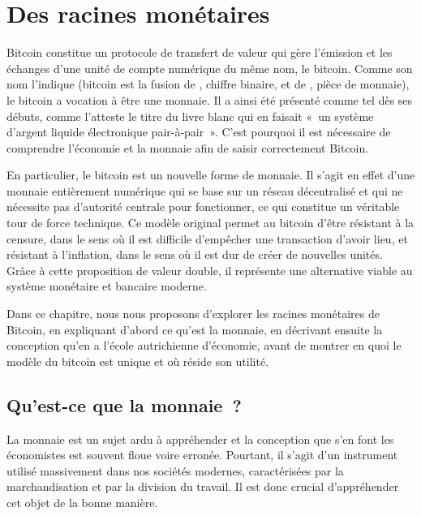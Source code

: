 
\chapter{Des racines monétaires}
\label{ch:monnaie}

Bitcoin constitue un protocole de transfert de valeur qui gère l'émission et les échanges d'une unité de compte numérique du même nom, le bitcoin. Comme son nom l'indique (bitcoin est la fusion de , chiffre binaire, et de , pièce de monnaie), le bitcoin a vocation à être une monnaie. Il a ainsi été présenté comme tel dès ses débuts, comme l'atteste le titre du livre blanc qui en faisait «~un système d'argent liquide électronique pair-à-pair~». C'est pourquoi il est nécessaire de comprendre l'économie et la monnaie afin de saisir correctement Bitcoin.

En particulier, le bitcoin est un nouvelle forme de monnaie. Il s'agit en effet d'une monnaie entièrement numérique qui se base sur un réseau décentralisé et qui ne nécessite pas d'autorité centrale pour fonctionner, ce qui constitue un véritable tour de force technique. Ce modèle original permet au bitcoin d'être résistant à la censure, dans le sens où il est difficile d'empêcher une transaction d'avoir lieu, et résistant à l'inflation, dans le sens où il est dur de créer de nouvelles unités. Grâce à cette proposition de valeur double, il représente une alternative viable au système monétaire et bancaire moderne.

Dans ce chapitre, nous nous proposons d'explorer les racines monétaires de Bitcoin, en expliquant d'abord ce qu'est la monnaie, en décrivant ensuite la conception qu'en a l'école autrichienne d'économie, avant de montrer en quoi le modèle du bitcoin est unique et où réside son utilité.

\section*{Qu'est-ce que la monnaie~?}

La monnaie est un sujet ardu à appréhender et la conception que s'en font les économistes est souvent floue voire erronée. Pourtant, il s'agit d'un instrument utilisé massivement dans nos sociétés modernes, caractérisées par la marchandisation et par la division du travail. Il est donc crucial d'appréhender cet objet de la bonne manière.

